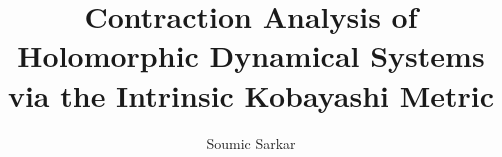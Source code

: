 \documentclass[preprint,12pt,authoryear]{elsarticle}
\begin{document}
\begin{frontmatter}



\title{Contraction Analysis of Holomorphic Dynamical Systems via the Intrinsic Kobayashi Metric} %


\author{Soumic Sarkar} %




\end{frontmatter}
\end{document}
